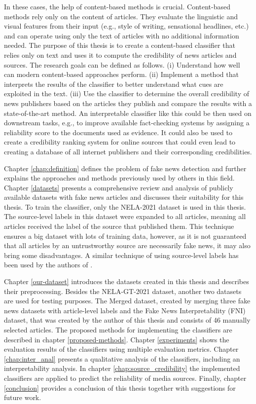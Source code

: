 In these cases, the help of content-based methods is crucial. Content-based methods rely only on the content of articles. They evaluate the linguistic and visual features from their input (e.g., style of writing, sensational headlines, etc.) and can operate using only the text of articles with no additional information needed.  The purpose of this thesis is to create a content-based classifier that relies only on text and uses it to compute the credibility of news articles and sources. The research goals can be defined as follows. (i) Understand how well can modern content-based approaches perform. (ii) Implement a method that interprets the results of the classifier to better understand what cues are exploited in the text. (iii) Use the classifier to determine the overall credibility of news publishers based on the articles they publish and compare the results with a state-of-the-art method. An interpretable classifier like this could be then used on downstream tasks, e.g., to improve available fact-checking systems by assigning a reliability score to the documents used as evidence. It could also be used to create a credibility ranking system for online sources that could even lead to creating a database of all internet publishers and their corresponding credibilities.

Chapter \ref{chap:definition} defines the problem of fake news detection and further explains the approaches and methods previously used by others in this field. Chapter \ref{datasets} presents a comprehensive review and analysis of publicly available datasets with fake news articles and discusses their suitability for this thesis. To train the classifier, only the NELA-2021 dataset is used in this thesis. The source-level labels in this dataset were expanded to all articles, meaning all articles received the label of the source that published them. This technique ensures a big dataset with lots of training data, however, as it is not guaranteed that all articles by an untrustworthy source are necessarily fake news, it may also bring some disadvantages. A similar technique of using source-level labels has been used by the authors of \cite{czech_paper}.

Chapter \ref{our-dataset} introduces the datasets created in this thesis and describes their preprocessing. Besides the NELA-GT-2021 dataset, another two datasets are used for testing purposes. The Merged dataset, created by merging three fake news datasets with article-level labels and the Fake News Interpretability (FNI) dataset, that was created by the author of this thesis and consists of 46 manually selected articles. The proposed methods for implementing the classifiers are described in chapter \ref{proposed-methods}. Chapter \ref{experiments} shows the evaluation results of the classifiers using multiple evaluation metrics.
Chapter \ref{chap:inter_anal} presents a qualitative analysis of the classifiers, including an interpretability analysis. In chapter \ref{chap:source_credibility} the implemented classifiers are applied to predict the reliability of media sources. Finally, chapter \ref{conclusion} provides a conclusion of this thesis together with suggestions for future work.




